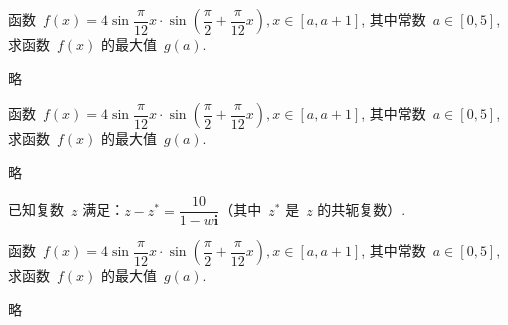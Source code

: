 \documentclass[answers]{BHCexam}
\begin{document}
\begin{questions}
\begin{solution}
\end{solution}

\question[14] 函数~$f(x)=4\sin\dfrac{\pi}{12}x\cdot\sin
    \left(\dfrac{\pi}{2}+\dfrac{\pi}{12}x\right),x\in[a,a+1]$,
    其中常数~$a\in[0,5]$, 求函数~$f(x)$ 的最大值~$g(a)$.

\begin{solution}
略
\end{solution}

\newpage

\question[16] 函数~$f(x)=4\sin\dfrac{\pi}{12}x\cdot\sin
    \left(\dfrac{\pi}{2}+\dfrac{\pi}{12}x\right),x\in[a,a+1]$,
    其中常数~$a\in[0,5]$, 求函数~$f(x)$ 的最大值~$g(a)$.

\begin{solution}
略
\end{solution}

\newpage
\question 已知复数~$z$ 满足：${z}-z^*=\dfrac{10}{1-w\textbf{i}}$（其中~$z^*$
是~$z$ 的共轭复数）.

\begin{solution}
\end{solution}

\newpage

\question[18] 函数~$f(x)=4\sin\dfrac{\pi}{12}x\cdot\sin
    \left(\dfrac{\pi}{2}+\dfrac{\pi}{12}x\right),x\in[a,a+1]$,
    其中常数~$a\in[0,5]$, 求函数~$f(x)$ 的最大值~$g(a)$.

\begin{solution}
略
\end{solution}

\end{questions}
\end{document}
